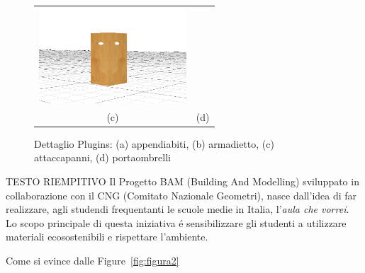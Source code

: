 \begin{figure}[htbp]
\begin{center}
\begin{tabular}{c @{\hspace{1em}} c}
\includegraphics[width=5.5cm]{images/portaombrelli} \\
 (c) & (d) \\
\end{tabular}
\end{center}
\caption{Dettaglio Plugins: (a) appendiabiti, (b) armadietto, (c) attaccapanni, (d) portaombrelli}\label{fig:figura1}
\end{figure}
\newpage

TESTO RIEMPITIVO
Il Progetto BAM (Building And Modelling) sviluppato in collaborazione con il CNG (Comitato Nazionale Geometri),
nasce dall'idea di far realizzare, agli studendi frequentanti le scuole medie in Italia,
l'\emph{aula che vorrei}. Lo scopo principale di questa iniziativa \'e sensibilizzare gli studenti a utilizzare
materiali ecosostenibili e rispettare l'ambiente.

Come si evince dalle Figure~\ref{fig:figura2}

